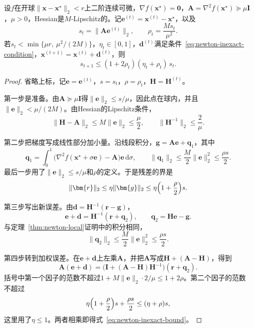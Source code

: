 \begin{theorem}[非精确Newton法的局部收敛]
\label{thm:newton-inexact-local}
设$f$在开球$\lVert\bm{x}-\bm{x}^\star\rVert_2<r$上二阶连续可微，$\nabla f(\bm{x}^\star)=\bm{0}$，$\bm{A}=\nabla^2f(\bm{x}^\star)\succeq\mu\bm{I}$，$\mu>0$，Hessian是$M$-Lipschitz的。记$\bm{e}^{(t)}=\bm{x}^{(t)}-\bm{x}^\star$，以及
\begin{equation}
 s_t=\lVert\bm{A}\bm{e}^{(t)}\rVert_2,\qquad \rho_t=\frac{Ms_t}{\mu^2}.
 \label{eq:newton-inexact-quantities}
\end{equation}
若$s_t<\min\{\mu r,\ \mu^2/(2M)\}$，$\eta_t\in[0,1]$，$\bm{d}^{(t)}$满足条件~\eqref{eq:newton-inexact-condition}，$\bm{x}^{(t+1)}=\bm{x}^{(t)}+\bm{d}^{(t)}$，则
\begin{equation}
 s_{t+1}\leq(1+2\rho_t)(\eta_t+\rho_t)\,s_t.
 \label{eq:newton-inexact-bound}
\end{equation}
\end{theorem}

\begin{proof}
省略上标，记$\bm{e}=\bm{e}^{(t)}$，$s=s_t$，$\rho=\rho_t$，$\bm{H}=\bm{H}^{(t)}$。

第一步是准备。由$\bm{A}\succeq\mu\bm{I}$得$\lVert\bm{e}\rVert_2\leq s/\mu$，因此点在球内，并且$\lVert\bm{e}\rVert_2<\mu/(2M)$。由Hessian的Lipschitz条件，
\[
 \lVert\bm{H}-\bm{A}\rVert_2\leq M\lVert\bm{e}\rVert_2\leq\frac\mu2,\qquad \lVert\bm{H}^{-1}\rVert_2\leq\frac2\mu.
\]

第二步把梯度写成线性部分加小量。沿线段积分，$\bm{g}=\bm{A}\bm{e}+\bm{q}_1$，其中
\[
 \bm{q}_1=\int_0^1\bigl(\nabla^2f(\bm{x}^\star+\sigma\bm{e})-\bm{A}\bigr)\bm{e}\,\mathrm{d}\sigma,\qquad
 \lVert\bm{q}_1\rVert_2\leq\frac M2\lVert\bm{e}\rVert_2^2\leq\frac{\rho s}2.
\]
最后一步用了$\lVert\bm{e}\rVert_2\leq s/\mu$和$\rho$的定义。于是残差的界是
\[
 \lVert\bm{r}\rVert_2\leq\eta\lVert\bm{g}\rVert_2\leq\eta\Bigl(1+\frac\rho2\Bigr)s.
\]

第三步写出新误差。由$\bm{d}=\bm{H}^{-1}(\bm{r}-\bm{g})$，
\[
 \bm{e}+\bm{d}=\bm{H}^{-1}(\bm{r}+\bm{q}_2),\qquad \bm{q}_2=\bm{H}\bm{e}-\bm{g}.
\]
与定理~\ref{thm:newton-local}证明中的积分相同，
\[
 \lVert\bm{q}_2\rVert_2\leq\frac M2\lVert\bm{e}\rVert_2^2\leq\frac{\rho s}2.
\]

第四步转到加权误差。在$\bm{e}+\bm{d}$上左乘$\bm{A}$，并把$\bm{A}$写成$\bm{H}+(\bm{A}-\bm{H})$，得到
\[
 \bm{A}(\bm{e}+\bm{d})=\bigl(\bm{I}+(\bm{A}-\bm{H})\bm{H}^{-1}\bigr)(\bm{r}+\bm{q}_2).
\]
括号中第一个因子的范数不超过$1+M\lVert\bm{e}\rVert_2\cdot2/\mu\leq1+2\rho$。第二个因子的范数不超过
\[
 \eta\Bigl(1+\frac\rho2\Bigr)s+\frac{\rho s}2\leq(\eta+\rho)s,
\]
这里用了$\eta\leq1$。两者相乘即得式~\eqref{eq:newton-inexact-bound}。
\end{proof}

